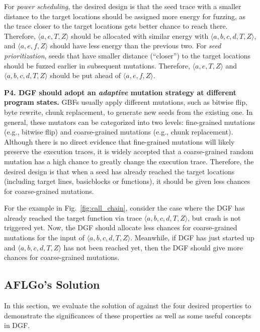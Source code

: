  For \emph{power scheduling}, the desired design is that the seed trace with a smaller distance to the target locations should be assigned more energy for fuzzing, as the trace closer to the target locations gets better chance to reach there. Therefore, $\langle a, e, T, Z\rangle$ should be allocated with similar energy with $\langle a, b, c, d, T, Z\rangle$, and $\langle a, e, f, Z\rangle$ should have less energy than the previous two. For \emph{seed prioritization}, seeds that have smaller distance (``closer'') to the target locations should be fuzzed earlier in subsequent mutations. Therefore, $\langle a, e, T, Z\rangle$ and $\langle a, b, c, d, T, Z\rangle$ should be put ahead of $\langle a, e, f, Z\rangle$.

\textbf{P4. DGF should adopt an \emph{adaptive} mutation strategy at different program states.}  \label{subsec:p4}
 GBFs usually apply different mutations, such as bitwise flip, byte rewrite, chunk replacement, to generate new seeds from the existing one. 
In general, these mutators can be categorized into two levels: fine-grained mutations (e.g., bitwise flip) and coarse-grained mutations (e.g., chunk replacement).
 Although there is no direct evidence that fine-grained mutations will likely preserve the execution traces, it is widely accepted that a coarse-grained random mutation has a high chance to greatly change the execution trace. Therefore, the desired design is that when a seed has already reached the target locations (including target lines, basicblocks or functions), it should be given less chances for coarse-grained mutations.
 
For the example in Fig.~\ref{fig:call_chain}, consider the case where the DGF has already reached the target function via trace $\langle a, b, c, d, T, Z\rangle $, but crash is not triggered yet.
Now, the DGF should allocate less chances for coarse-grained mutations for the input of $\langle a, b, c, d, T, Z\rangle $.
Meanwhile, if DGF has just started up and $\langle a, b, c, d, T, Z\rangle $ has not been reached yet, then the DGF should give more chances for coarse-grained mutations.



\subsection{AFLGo's Solution} \label{subsec:aflgo_sol}


In this section, we evaluate the solution of \aflgo against the four desired properties to demonstrate the significances of these properties as well as some useful concepts in DGF.






